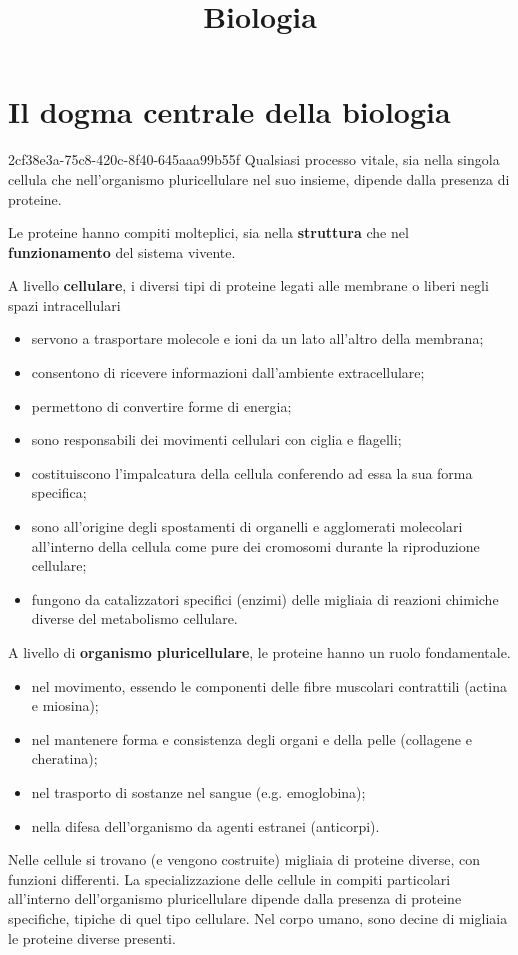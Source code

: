 \documentclass[preview]{standalone}
\begin{document}
\title{Biologia}
\genpage

\section{Il dogma centrale della biologia}

\begin{snippet}{2cf38e3a-75c8-420c-8f40-645aaa99b55f}
    Qualsiasi processo vitale, sia nella singola cellula che nell'organismo pluricellulare nel suo
    insieme, dipende dalla presenza di proteine.

    Le proteine hanno compiti molteplici, sia nella \textbf{struttura}
    che nel \textbf{funzionamento} del sistema
    vivente.

    A livello \textbf{cellulare}, i diversi tipi di proteine legati alle membrane o liberi negli spazi
    intracellulari

    \begin{itemize}
        \item servono a trasportare molecole e ioni da un lato all'altro della membrana;
        \item consentono di ricevere informazioni dall'ambiente extracellulare;
        \item permettono di convertire forme di energia;
        \item sono responsabili dei movimenti cellulari con ciglia e flagelli;
        \item costituiscono l'impalcatura della cellula conferendo ad essa la sua forma specifica;
        \item sono all'origine degli spostamenti di organelli e agglomerati molecolari all'interno della
        cellula come pure dei cromosomi durante la riproduzione cellulare;
        \item fungono da catalizzatori specifici (enzimi) delle migliaia di reazioni chimiche diverse del
        metabolismo cellulare.
    \end{itemize}

    A livello di \textbf{organismo pluricellulare}, le proteine hanno un ruolo
    fondamentale.

    \begin{itemize}
        \item nel movimento, essendo le componenti delle fibre muscolari contrattili
        (actina e miosina);
        \item nel mantenere forma e consistenza degli organi e della pelle (collagene e
        cheratina);
        \item nel trasporto di sostanze nel sangue (e.g. emoglobina);
        \item nella difesa dell'organismo da agenti estranei (anticorpi).
    \end{itemize}
    
    Nelle cellule si trovano (e vengono costruite) migliaia di proteine diverse, con
    funzioni differenti. La specializzazione delle cellule in compiti particolari
    all'interno dell'organismo pluricellulare dipende dalla presenza di proteine
    specifiche, tipiche di quel tipo cellulare. Nel corpo umano, sono decine di
    migliaia le proteine diverse presenti.
\end{snippet}
\end{document}
